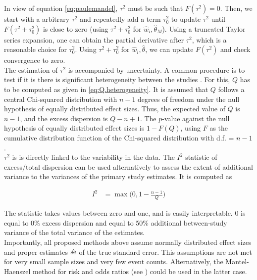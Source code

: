 \documentclass[11pt,a4paper,twoside]{book}\usepackage[]{graphicx}\usepackage[]{color}
\begin{document}
In view of equation \eqref{eq:paulemandel}, $\tau^2$ must be such that $F(\tau^2) = 0$. Then, we start with a arbitrary $\tau^2$ and repeatedly add a term $\tau_0^2$ to update $\tau^2$ until $F(\tau^2 + \tau_0^2)$ is close to zero (using $\tau^2 + \tau_0^2$ for $\hat{w}_i, \hat{\theta}_M$). Using a truncated Taylor series expansion, one can obtain the partial derivative after $\tau^2$, which is a reasonable choice for $\tau_0^2$. Using $\tau^2 + \tau_0^2$ for $\hat{w}_i, \hat{\theta}$, we can update $F(\tau^2)$ and check convergence to zero. \\
The estimation of $\tau^2$ is accompanied by uncertainty. A common procedure is to test if it is there is significant heterogeneity between the studies \cite[p. 109]{Intro.meta}. For this, $Q$ has to be computed as given in \eqref{eq:Q.heterogeneity}. It is assumed that $Q$ follows a central Chi-squared distribution with $n -1$ degrees of freedom under the null hypothesis of equally distributed effect sizes. Thus, the expected value of $Q$ is $n-1$, and the excess dispersion is $Q - n + 1$. The  $p$\hspace{0.4mm}-value against the null hypothesis of equally distributed effect sizes is $1 - F(Q)$, using $F$ as the cumulative distribution function of the Chi-squared distribution with d.f. = $n-1$. \\
$\tau^2$ is  is directly linked to the variability in the data. The $I^2$ statistic of excess/total dispersion can be used alternatively to assess the extent of additional variance to the variances of the primary study estimates. It is computed as

\begin{align}
I^2 &= \max\Big(0, 1 - \frac{n-1}{Q}\Big) \nonumber%
\end{align}

The statistic takes values between zero and one, and is easily interpretable. 0 is equal to 0\% excess dispersion and  equal to 50\% additional between-study variance of the total variance of the estimates. \\
Importantly, all proposed methods above assume normally distributed effect sizes and proper estimates $\hat{\operatorname{se}}$ of the true standard error. This assumptions are not met for very small sample sizes and very few event counts. Alternatively, the Mantel-Haenszel method for risk and odds ratios (see \eg \citealp{mantel.haenszel}) could be used in the latter case. 
\end{document}
